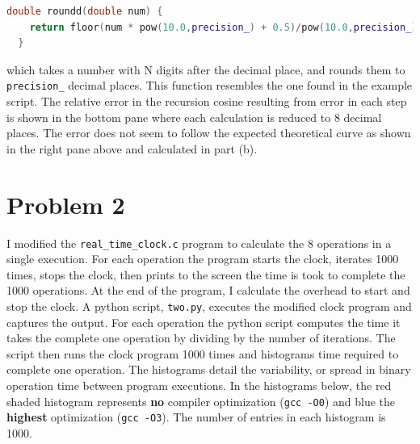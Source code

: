 \documentclass[singlepage,notitlepage,nofootinbib,11pt]{revtex4-1}
\begin{document}
\begin{lstlisting}[language=C++]
  double roundd(double num) {
    return floor(num * pow(10.0,precision_) + 0.5)/pow(10.0,precision_);
  }
\end{lstlisting}
which takes a number with N digits after the decimal place, and rounds them to \verb|precision_| decimal places. This function resembles the one found in the example script. The relative error in the recursion cosine resulting from error in each step is shown in the bottom pane where each calculation is reduced to 8 decimal places. The error does not seem to follow the expected theoretical curve as shown in the right pane above and calculated in part (b).
\section{Problem 2}
I modified the \verb|real_time_clock.c| program to calculate the 8 operations in a single execution. For each operation the program starts the clock, iterates 1000 times, stops the clock, then prints to the screen the time is took to complete the 1000 operations. At the end of the program, I calculate the overhead to start and stop the clock. A python script, \verb|two.py|, executes the modified clock program and captures the output. For each operation the python script computes the time it takes the complete one operation by dividing by the number of iterations. The script then runs the clock program 1000 times and histograms time required to complete one operation. The histograms detail the variability, or spread in binary operation time between program executions. In the histograms below, the red shaded histogram represents {\bf no} compiler optimization (\verb|gcc -O0|) and blue the {\bf highest} optimization (\verb|gcc -O3|). The number of entries in each histogram is 1000.
\end{document}
